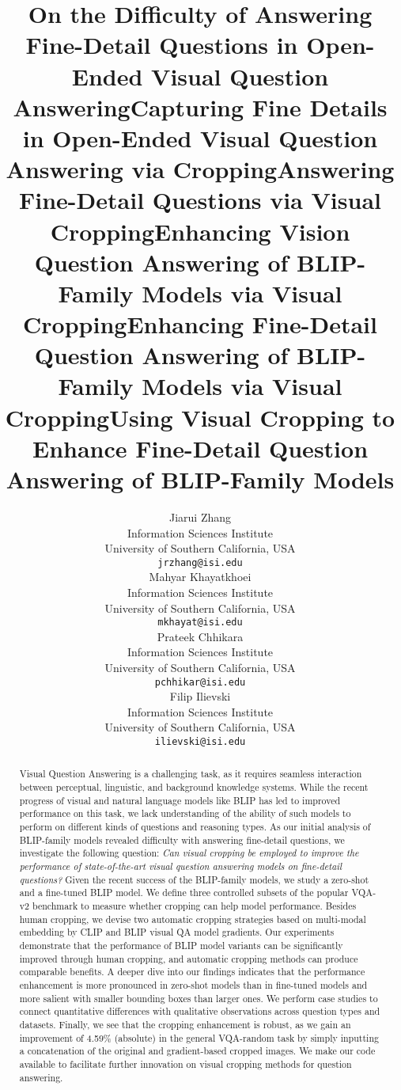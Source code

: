 \documentclass{article}
\title{On the Difficulty of Answering Fine-Detail Questions in Open-Ended Visual Question Answering}
\title{Capturing Fine Details in Open-Ended Visual Question Answering via Cropping}
\title{Answering Fine-Detail Questions via Visual Cropping}
\title{Enhancing Vision Question Answering of BLIP-Family Models via Visual Cropping}
\title{Enhancing Fine-Detail Question Answering of BLIP-Family Models via Visual Cropping}
\title{Using Visual Cropping to Enhance Fine-Detail Question Answering of BLIP-Family Models}
\author{%
  Jiarui Zhang \\
  Information Sciences Institute\\
  University of Southern California, USA \\
  \texttt{jrzhang@isi.edu} \\
  \And
  Mahyar Khayatkhoei \\
  Information Sciences Institute \\
  University of Southern California, USA \\
  \texttt{mkhayat@isi.edu} \\
  \AND
  Prateek Chhikara \\
  Information Sciences Institute \\
  University of Southern California, USA \\
  \texttt{pchhikar@isi.edu} \\
  \And
  Filip Ilievski \\
  Information Sciences Institute \\
  University of Southern California, USA \\
  \texttt{ilievski@isi.edu} \\
}
\begin{document}

\maketitle


\begin{abstract}
Visual Question Answering is a challenging task, as it requires seamless interaction between perceptual, linguistic, and background knowledge systems. While the recent progress of visual and natural language models like BLIP has led to improved performance on this task, we lack understanding of the ability of such models to perform on different kinds of questions and reasoning types. As our initial analysis of BLIP-family models revealed difficulty with answering fine-detail questions, we investigate the following question: \textit{Can visual cropping be employed to improve the performance of state-of-the-art visual question answering models on fine-detail questions?}
Given the recent success of the BLIP-family models, we study a zero-shot and a fine-tuned BLIP model. We define three controlled subsets of the popular VQA-v2 benchmark to measure whether cropping can help model performance. Besides human cropping, we devise two automatic cropping strategies based on multi-modal embedding by CLIP and BLIP visual QA model gradients.
Our experiments demonstrate that the performance of BLIP model variants can be significantly improved through human cropping, and automatic cropping methods can produce comparable benefits. A deeper dive into our findings indicates that the performance enhancement is more pronounced in zero-shot models than in fine-tuned models and more salient with smaller bounding boxes than larger ones.
We perform case studies to connect quantitative differences with qualitative observations across question types and datasets.
Finally, we see that the cropping enhancement is robust, as we gain an improvement of 4.59\% (absolute) in the general VQA-random task by simply inputting a concatenation of the original and gradient-based cropped images.
We make our code available to facilitate further innovation on visual cropping methods for question answering.

\end{abstract}
\end{document}
